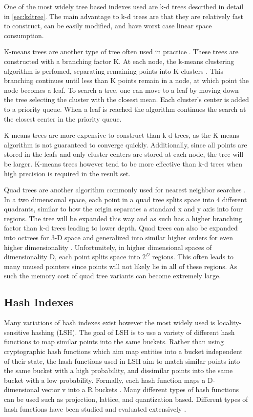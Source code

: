 One of the most widely tree based indexes used are k-d trees described in detail in \ref{sec:kdtree}.  The main advantage to k-d trees are that they are relatively fast to construct, can be easily modified, and have worst case linear space consumption.

K-means trees are another type of tree often used in practice \citep{flann_pami_2014}.  These trees are constructed with a branching factor K.  At each node, the k-means clustering algorithm is perfomed, separating remaining points into K clusters \citep{hartigan1979algorithm}.  This branching continues until less than K points remain in a node, at which point the node becomes a leaf.  To search a tree, one can move to a leaf by moving down the tree selecting the cluster with the closest mean.  Each cluster's center is added to a priority queue.  When a leaf is reached the algorithm continues the search at the closest center in the priority queue.

K-means trees are more expensive to construct than k-d trees, as the K-means algorithm is not guaranteed to converge quickly.  Additionally, since all points are stored in the leafs and only cluster centers are stored at each node, the tree will be larger.  K-means trees however tend to be more effective than k-d trees when high precision is required in the result set.

Quad trees are another algorithm commonly used for nearest neighbor searches \citep{finkel1974quad}.  In a two dimensional space, each point in a quad tree splits space into 4 different quadrants, similar to how the origin separates a standard x and y axis into four regions.  The tree will be expanded this way and as such has a higher branching factor than k-d trees leading to lower depth.  Quad trees can also be expanded into octrees for 3-D space and generalized into similar higher orders for even higher dimensionality \citep{samet1988overview}.  Unfortunitely, in higher dimensional spaces of dimensionality D, each point splits space into $2^D$ regions.  This often leads to many unused pointers since points will not likely lie in all of these regions.  As such the memory cost of quad tree variants can become extremely large.

\subsection{Hash Indexes}

Many variations of hash indexes exist however the most widely used is locality-sensitive hashing (LSH).  The goal of LSH is to use a variety of different hash functions to map similar points into the same buckets.  Rather than using cryptographic hash functions which aim map entities into a bucket independent of their state, the hash functions used in LSH aim to match similar points into the same bucket with a high probability, and dissimilar points into the same bucket with a low probability.  Formally, each hash function maps a D-dimensional vector v into a R buckets \citep{datar2004locality}.  Many different types of hash functions can be used such as projection, lattice, and quantization based.  Different types of hash functions have been studied and evaluated extensively \citep{pauleve2010locality}.

